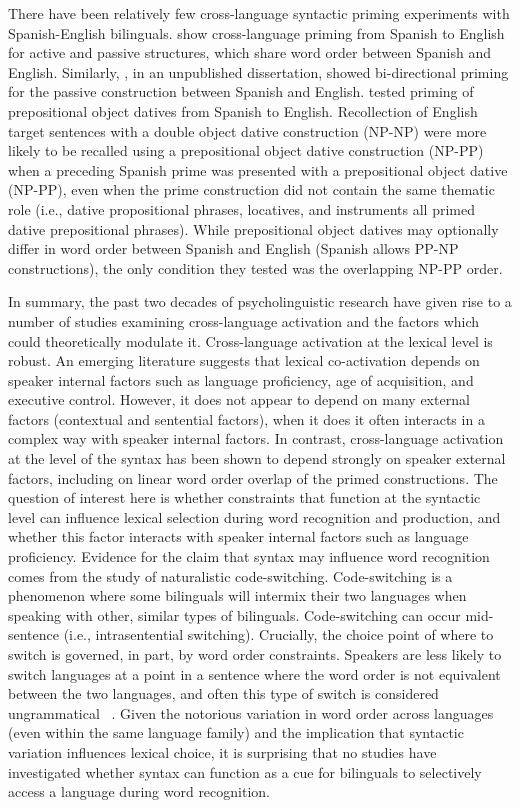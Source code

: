 There have been relatively few cross-language syntactic priming experiments with Spanish-English bilinguals.  \citet{Hartsuiker2004} show cross-language priming from Spanish to English for active and passive structures, which share word order between Spanish and English. Similarly,  \citet{Cooperson2013}, in an unpublished dissertation, showed bi-directional priming for the passive construction between Spanish and English.  \citet{Meijer2003} tested priming of prepositional object datives from Spanish to English. Recollection of English target sentences with a double object dative construction (NP-NP) were more likely to be recalled using a prepositional object dative construction (NP-PP) when a preceding Spanish prime was presented with a prepositional object dative (NP-PP), even when the prime construction did not contain the same thematic role (i.e., dative propositional phrases, locatives, and instruments all primed dative prepositional phrases). While prepositional object datives may optionally differ in word order between Spanish and English (Spanish allows PP-NP constructions), the only condition they tested was the overlapping NP-PP order.

In summary, the past two decades of psycholinguistic research have given rise to a number of studies examining cross-language activation and the factors which could theoretically modulate it. Cross-language activation at the lexical level is robust. An emerging literature suggests that lexical co-activation depends on speaker internal factors such as language proficiency, age of acquisition, and executive control. However, it does not appear to depend on many external factors (contextual and sentential factors), when it does it often interacts in a complex way with speaker internal factors. In contrast, cross-language activation at the level of the syntax has been shown to depend strongly on speaker external factors, including on linear word order overlap of the primed constructions. The question of interest here is whether constraints that function at the syntactic level can influence lexical selection during word recognition and production, and whether this factor interacts with speaker internal factors such as language proficiency. Evidence for the claim that syntax may influence word recognition comes from the study of naturalistic code-switching. Code-switching is a phenomenon where some bilinguals will intermix their two languages when speaking with other, similar types of bilinguals. Code-switching can occur mid-sentence (i.e., intrasentential switching). Crucially, the choice point of where to switch is governed, in part, by word order constraints. Speakers are less likely to switch languages at a point in a sentence where the word order is not equivalent between the two languages, and often this type of switch is considered ungrammatical ~\citep{Poplack1980, Lipski1978}. Given the notorious variation in word order across languages (even within the same language family) and the implication that syntactic variation influences lexical choice, it is surprising that no studies have investigated whether syntax can function as a cue for bilinguals to selectively access a language during word recognition. 

